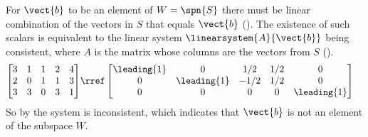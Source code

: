 For $\vect{b}$ to be an element of $W=\spn{S}$ there must be linear combination of the vectors in $S$ that equals $\vect{b}$ ().  The existence of such scalars is equivalent to the linear system $\linearsystem{A}{\vect{b}}$ being consistent, where $A$ is the matrix whose columns are the vectors from $S$ ().
%
\begin{align*}
\begin{bmatrix} 
3 & 1 & 1 & 2 & 4\\
2 & 0 & 1 & 1 & 3\\
3 & 3 & 0 & 3 & 1
\end{bmatrix} 
&\rref
\begin{bmatrix} 
\leading{1} & 0 & 1/2 & 1/2 & 0\\ 
0 & \leading{1} & -1/2 & 1/2 & 0\\ 
0 & 0 & 0 & 0 & \leading{1} 
\end{bmatrix}
\end{align*}
%
So by  the system is inconsistent, which indicates that $\vect{b}$ is not an element of the subspace $W$.
